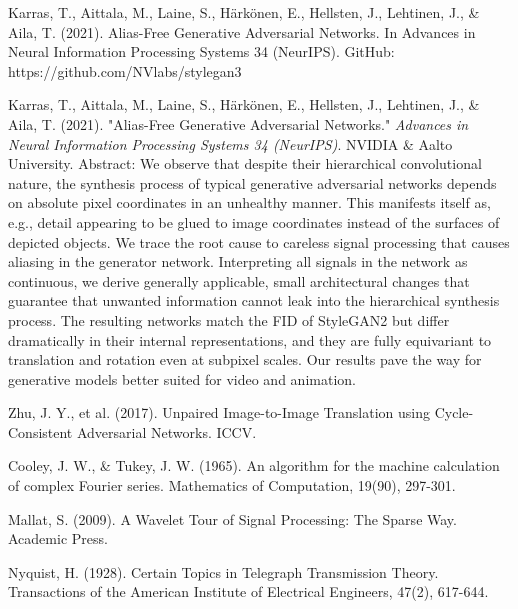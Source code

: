 \documentclass{article}
\begin{document}

\begin{thebibliography}{9}
 Karras, T., Aittala, M., Laine, S., Härkönen, E., Hellsten, J., Lehtinen, J., \& Aila, T. (2021). Alias-Free Generative Adversarial Networks. In Advances in Neural Information Processing Systems 34 (NeurIPS). GitHub: https://github.com/NVlabs/stylegan3

 Karras, T., Aittala, M., Laine, S., Härkönen, E., Hellsten, J., Lehtinen, J., \& Aila, T. (2021). 
"Alias-Free Generative Adversarial Networks."
\textit{Advances in Neural Information Processing Systems 34 (NeurIPS)}. 
NVIDIA \& Aalto University.
Abstract: We observe that despite their hierarchical convolutional nature, the synthesis process of typical generative adversarial networks depends on absolute pixel coordinates in an unhealthy manner. This manifests itself as, e.g., detail appearing to be glued to image coordinates instead of the surfaces of depicted objects. We trace the root cause to careless signal processing that causes aliasing in the generator network. Interpreting all signals in the network as continuous, we derive generally applicable, small architectural changes that guarantee that unwanted information cannot leak into the hierarchical synthesis process. The resulting networks match the FID of StyleGAN2 but differ dramatically in their internal representations, and they are fully equivariant to translation and rotation even at subpixel scales. Our results pave the way for generative models better suited for video and animation.

 Zhu, J. Y., et al. (2017). Unpaired Image-to-Image Translation using Cycle-Consistent Adversarial Networks. ICCV.

 Cooley, J. W., & Tukey, J. W. (1965). An algorithm for the machine calculation of complex Fourier series. Mathematics of Computation, 19(90), 297-301.

 Mallat, S. (2009). A Wavelet Tour of Signal Processing: The Sparse Way. Academic Press.

 Nyquist, H. (1928). Certain Topics in Telegraph Transmission Theory. Transactions of the American Institute of Electrical Engineers, 47(2), 617-644.
\end{thebibliography}
\end{document}
